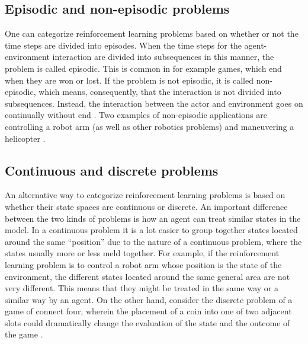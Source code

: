\subsection{Episodic and non-episodic problems}
One can categorize reinforcement learning problems based on whether or not the time steps are divided into episodes. When the time steps for the agent-environment interaction are divided into subsequences in this manner, the problem is called episodic. This is common in for example games, which end when they are won or lost. If the problem is not episodic, it is called non-episodic, which means, consequently, that the interaction is not divided into subsequences. Instead, the interaction between the actor and environment goes on continually without end \parencite{barto1998reinforcement}. Two examples of non-episodic applications are controlling a robot arm (as well as other robotics problems) and maneuvering a helicopter \parencite{ng2006autonomous}. 

\subsection{Continuous and discrete problems}
An alternative way to categorize reinforcement learning problems is based on whether their state spaces are continuous or discrete. An important difference between the two kinds of problems is how an agent can treat similar states in the model. In a continuous problem it is a lot easier to group together states located around the same ``position'' due to the nature of a continuous problem, where the states usually more or less meld together. For example, if the reinforcement learning problem is to control a robot arm whose position is the state of the environment, the different states located around the same general area are not very different. This means that they might be treated in the same way or a similar way by an agent. On the other hand, consider the discrete problem of a game of connect four, wherein the placement of a coin into one of two adjacent slots could dramatically change the evaluation of the state and the outcome of the game \parencite{barto1998reinforcement}.
